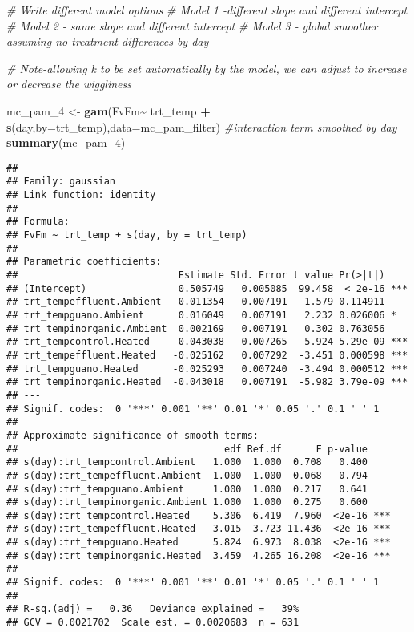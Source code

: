 \documentclass[
]{article}
\newenvironment{Shaded}{\begin{snugshade}}{\end{snugshade}}
\newcommand{\AttributeTok}[1]{\textcolor[rgb]{0.13,0.29,0.53}{#1}}
\newcommand{\CommentTok}[1]{\textcolor[rgb]{0.56,0.35,0.01}{\textit{#1}}}
\newcommand{\FunctionTok}[1]{\textcolor[rgb]{0.13,0.29,0.53}{\textbf{#1}}}
\newcommand{\NormalTok}[1]{#1}
\newcommand{\OtherTok}[1]{\textcolor[rgb]{0.56,0.35,0.01}{#1}}
\newcommand{\SpecialCharTok}[1]{\textcolor[rgb]{0.81,0.36,0.00}{\textbf{#1}}}
\begin{document}
\begin{Shaded}
\begin{Highlighting}[]
\CommentTok{\# Write different model options}
  \CommentTok{\# Model 1 {-}different slope and different intercept}
  \CommentTok{\# Model 2 {-} same slope and different intercept}
  \CommentTok{\# Model 3 {-} global smoother assuming no treatment differences by day}

\CommentTok{\# Note{-}allowing \textquotesingle{}k\textquotesingle{} to be set automatically by the model, we can adjust to increase or decrease the \textquotesingle{}wiggliness\textquotesingle{}}
  
\NormalTok{mc\_pam\_4 }\OtherTok{\textless{}{-}} \FunctionTok{gam}\NormalTok{(FvFm}\SpecialCharTok{\textasciitilde{}}\NormalTok{ trt\_temp }\SpecialCharTok{+} \FunctionTok{s}\NormalTok{(day,}\AttributeTok{by=}\NormalTok{trt\_temp),}\AttributeTok{data=}\NormalTok{mc\_pam\_filter) }\CommentTok{\#interaction term smoothed by day}
\FunctionTok{summary}\NormalTok{(mc\_pam\_4)}
\end{Highlighting}
\end{Shaded}

\begin{verbatim}
## 
## Family: gaussian 
## Link function: identity 
## 
## Formula:
## FvFm ~ trt_temp + s(day, by = trt_temp)
## 
## Parametric coefficients:
##                            Estimate Std. Error t value Pr(>|t|)    
## (Intercept)                0.505749   0.005085  99.458  < 2e-16 ***
## trt_tempeffluent.Ambient   0.011354   0.007191   1.579 0.114911    
## trt_tempguano.Ambient      0.016049   0.007191   2.232 0.026006 *  
## trt_tempinorganic.Ambient  0.002169   0.007191   0.302 0.763056    
## trt_tempcontrol.Heated    -0.043038   0.007265  -5.924 5.29e-09 ***
## trt_tempeffluent.Heated   -0.025162   0.007292  -3.451 0.000598 ***
## trt_tempguano.Heated      -0.025293   0.007240  -3.494 0.000512 ***
## trt_tempinorganic.Heated  -0.043018   0.007191  -5.982 3.79e-09 ***
## ---
## Signif. codes:  0 '***' 0.001 '**' 0.01 '*' 0.05 '.' 0.1 ' ' 1
## 
## Approximate significance of smooth terms:
##                                    edf Ref.df      F p-value    
## s(day):trt_tempcontrol.Ambient   1.000  1.000  0.708   0.400    
## s(day):trt_tempeffluent.Ambient  1.000  1.000  0.068   0.794    
## s(day):trt_tempguano.Ambient     1.000  1.000  0.217   0.641    
## s(day):trt_tempinorganic.Ambient 1.000  1.000  0.275   0.600    
## s(day):trt_tempcontrol.Heated    5.306  6.419  7.960  <2e-16 ***
## s(day):trt_tempeffluent.Heated   3.015  3.723 11.436  <2e-16 ***
## s(day):trt_tempguano.Heated      5.824  6.973  8.038  <2e-16 ***
## s(day):trt_tempinorganic.Heated  3.459  4.265 16.208  <2e-16 ***
## ---
## Signif. codes:  0 '***' 0.001 '**' 0.01 '*' 0.05 '.' 0.1 ' ' 1
## 
## R-sq.(adj) =   0.36   Deviance explained =   39%
## GCV = 0.0021702  Scale est. = 0.0020683  n = 631
\end{verbatim}
\end{document}
